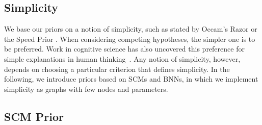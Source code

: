 \documentclass{article}
\begin{document}
\subsection{Simplicity}
\label{sec:modelling simplicity assumptions}
We base our priors on a notion of simplicity, such as stated by Occam's Razor or the Speed Prior \citep{speedprior}.
When considering competing hypotheses, the simpler one
is to be preferred.
Work in cognitive science has also uncovered this preference for simple explanations in human thinking~\citep{explanatoryvalues}.
Any notion of simplicity, however, depends on choosing a particular criterion that defines simplicity.
In the following, we introduce priors based on SCMs and BNNs, in which we implement simplicity as graphs with few nodes and parameters. %
\subsection{SCM Prior}
\end{document}
